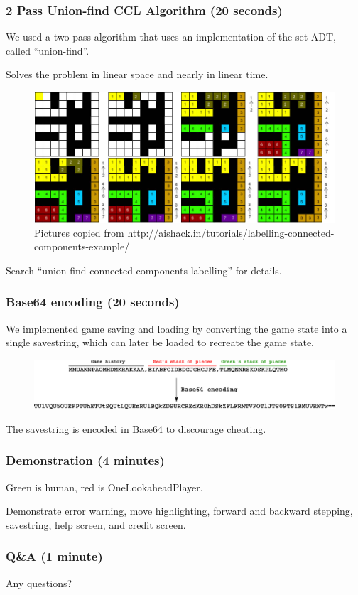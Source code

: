 \documentclass{beamer}
\begin{document}
\begin{frame}
\frametitle{2 Pass Union-find CCL Algorithm (20 seconds)}
We used a two pass algorithm that uses an implementation of the set ADT, called ``union-find''. 

Solves the problem in linear space and nearly in linear time. 
\begin{figure}
\includegraphics[width=0.9\linewidth]{ccl_algo}
\caption{{\tiny{}Pictures copied from http://aishack.in/tutorials/labelling-connected-components-example/}}
\end{figure}

Search ``union find connected components labelling'' for details.
\end{frame}

\begin{frame}
\frametitle{Base64 encoding (20 seconds)}
We implemented game saving and loading by converting the game state into a single savestring, which can later be loaded to recreate the game state. 
\begin{figure}
\includegraphics[width=\linewidth]{base64_conversion}
\end{figure}
The savestring is encoded in Base64 to discourage cheating.
\end{frame}

\begin{frame}
\frametitle{Demonstration (4 minutes)}
Green is human, red is OneLookaheadPlayer.

Demonstrate error warning, move highlighting, forward and backward stepping, savestring, help screen, and credit screen.
\end{frame}

\begin{frame}
\frametitle{Q\&{}A (1 minute)}
Any questions?
\end{frame}

\end{document}
